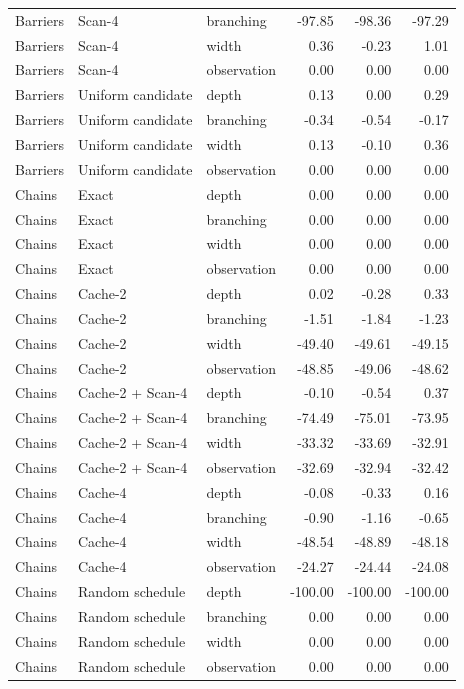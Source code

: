 \begin{longtable}{lllrrr}
Barriers & Scan-4 & branching & -97.85 & -98.36 & -97.29\\
Barriers & Scan-4 & width & 0.36 & -0.23 & 1.01\\
Barriers & Scan-4 & observation & 0.00 & 0.00 & 0.00\\
Barriers & Uniform candidate & depth & 0.13 & 0.00 & 0.29\\
Barriers & Uniform candidate & branching & -0.34 & -0.54 & -0.17\\
Barriers & Uniform candidate & width & 0.13 & -0.10 & 0.36\\
Barriers & Uniform candidate & observation & 0.00 & 0.00 & 0.00\\
Chains & Exact & depth & 0.00 & 0.00 & 0.00\\
Chains & Exact & branching & 0.00 & 0.00 & 0.00\\
Chains & Exact & width & 0.00 & 0.00 & 0.00\\
Chains & Exact & observation & 0.00 & 0.00 & 0.00\\
Chains & Cache-2 & depth & 0.02 & -0.28 & 0.33\\
Chains & Cache-2 & branching & -1.51 & -1.84 & -1.23\\
Chains & Cache-2 & width & -49.40 & -49.61 & -49.15\\
Chains & Cache-2 & observation & -48.85 & -49.06 & -48.62\\
Chains & Cache-2 + Scan-4 & depth & -0.10 & -0.54 & 0.37\\
Chains & Cache-2 + Scan-4 & branching & -74.49 & -75.01 & -73.95\\
Chains & Cache-2 + Scan-4 & width & -33.32 & -33.69 & -32.91\\
Chains & Cache-2 + Scan-4 & observation & -32.69 & -32.94 & -32.42\\
Chains & Cache-4 & depth & -0.08 & -0.33 & 0.16\\
Chains & Cache-4 & branching & -0.90 & -1.16 & -0.65\\
Chains & Cache-4 & width & -48.54 & -48.89 & -48.18\\
Chains & Cache-4 & observation & -24.27 & -24.44 & -24.08\\
Chains & Random schedule & depth & -100.00 & -100.00 & -100.00\\
Chains & Random schedule & branching & 0.00 & 0.00 & 0.00\\
Chains & Random schedule & width & 0.00 & 0.00 & 0.00\\
Chains & Random schedule & observation & 0.00 & 0.00 & 0.00\\

\end{longtable}
